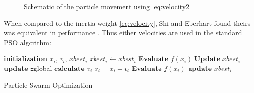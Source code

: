 \begin{figure}[!h]
    \centering
    
    \caption{Schematic of the particle movement using \eqref{eq:velocity2}}
    \label{fig:particle movement}
\end{figure}

When compared to the inertia weight \eqref{eq:velocity}, Shi and Eberhart found theirs was equivalent in performance \cite{Shi}. 
Thus either velocities are used in the standard PSO algorithm: 
\begin{algorithm}[H]
  \begin{algorithmic}[1]

        \State \textbf{initialization} $x_i$, $v_i$, $xbest_i$ 
        $xbest_i \gets xbest_i$
        \State \textbf{Evaluate} $f(x_i)$  
        \State \textbf{Update} $xbest_i$ 
    \EndFor
            \State \textbf{update} xglobal 
            \State \textbf{calculate} $v_i$ 
            \State $x_i = x_i + v_i$
            \State \textbf{Evaluate} $f(x_i)$
            \State \textbf{update} $xbest_i$
        \EndFor
    \EndWhile
  \end{algorithmic}
\caption{Particle Swarm Optimization}
\label{algorithmPSO}
\end{algorithm}

